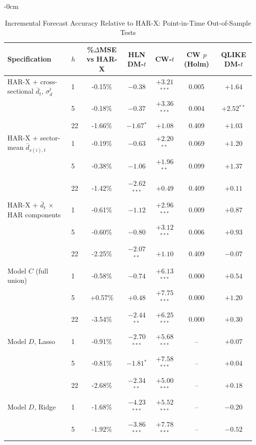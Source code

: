
\begin{table}[htbp]
\begin{adjustwidth}{-\extralength}{0cm}
\centering
\caption{Incremental Forecast Accuracy Relative to HAR-X: Point-in-Time Out-of-Sample Tests}
\label{tab:harx_tests}
\footnotesize
\setlength{\tabcolsep}{4pt}
\begin{tabular}{llccccc}
\toprule
Specification & $h$ & \%$\Delta$MSE vs HAR-X & HLN DM-$t$ & CW-$t$ & CW $p$ (Holm) & QLIKE DM-$t$ \\
\midrule
HAR-X + cross-sectional $\bar d_t$, $\sigma_d^t$ & 1 & -0.15\% & $-0.38$ & $+3.21$$^{***}$ & 0.005 & $+1.64$ \\
 & 5 & -0.18\% & $-0.37$ & $+3.36$$^{***}$ & 0.004 & $+2.52$$^{**}$ \\
 & 22 & -1.66\% & $-1.67$$^{*}$ & $+1.08$ & 0.409 & $+1.03$ \\
\midrule
HAR-X + sector-mean $\bar d_{s(i),t}$ & 1 & -0.19\% & $-0.63$ & $+2.20$$^{**}$ & 0.069 & $+1.20$ \\
 & 5 & -0.38\% & $-1.06$ & $+1.96$$^{**}$ & 0.099 & $+1.37$ \\
 & 22 & -1.42\% & $-2.62$$^{***}$ & $+0.49$ & 0.409 & $+0.11$ \\
\midrule
HAR-X + $\bar d_t$ $\times$ HAR components & 1 & -0.61\% & $-1.12$ & $+2.96$$^{***}$ & 0.009 & $+0.87$ \\
 & 5 & -0.60\% & $-0.80$ & $+3.12$$^{***}$ & 0.006 & $+0.93$ \\
 & 22 & -2.25\% & $-2.07$$^{**}$ & $+1.10$ & 0.409 & $-0.07$ \\
\midrule
Model $C$ (full union) & 1 & -0.58\% & $-0.74$ & $+6.13$$^{***}$ & 0.000 & $+0.54$ \\
 & 5 & +0.57\% & $+0.48$ & $+7.75$$^{***}$ & 0.000 & $+1.20$ \\
 & 22 & -3.54\% & $-2.44$$^{**}$ & $+6.25$$^{***}$ & 0.000 & $+0.30$ \\
\midrule
Model $D$, Lasso & 1 & -0.91\% & $-2.70$$^{***}$ & $+5.68$$^{***}$ & -- & $+0.07$ \\
 & 5 & -0.81\% & $-1.81$$^{*}$ & $+7.58$$^{***}$ & -- & $+0.04$ \\
 & 22 & -2.68\% & $-2.34$$^{**}$ & $+5.00$$^{***}$ & -- & $+0.18$ \\
\midrule
Model $D$, Ridge & 1 & -1.68\% & $-4.23$$^{***}$ & $+5.52$$^{***}$ & -- & $-0.20$ \\
 & 5 & -1.92\% & $-3.86$$^{***}$ & $+7.78$$^{***}$ & -- & $-0.52$ \\

\end{tabular}
\end{adjustwidth}
\end{table}
